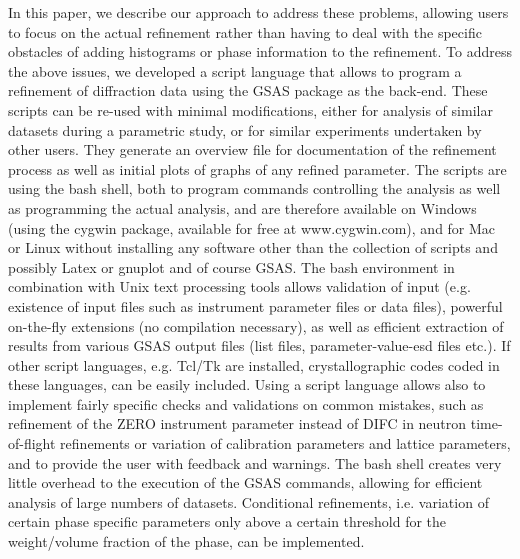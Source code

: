 In this paper, we describe our approach to address these problems, allowing users to focus on the actual refinement rather than having to deal with the specific obstacles of adding histograms or phase information to the refinement.  To address the above issues, we developed a script language that allows to program a refinement of diffraction data using the GSAS \cite{larson2004gsas} package as the back-end. These scripts can be re-used with minimal modifications, either for analysis of similar datasets during a parametric study, or for similar experiments undertaken by other users. They generate an overview file for documentation of the refinement process as well as initial plots of graphs of any refined parameter. The scripts are using the bash shell, both to program commands controlling the analysis as well as programming the actual analysis, and are therefore available on Windows (using the cygwin package, available for free at www.cygwin.com), and for Mac or Linux without installing any software other than the collection of scripts and possibly Latex or gnuplot and of course GSAS. The bash environment in combination with Unix text processing tools allows validation of input (e.g. existence of input files such as instrument parameter files or data files), powerful on-the-fly extensions (no compilation necessary), as well as efficient extraction of results from various GSAS output files (list files, parameter-value-esd files etc.). If other script languages, e.g. Tcl/Tk are installed, crystallographic codes coded in these languages, can be easily included. Using a script language allows also to implement fairly specific checks and validations on common mistakes, such as refinement of the ZERO instrument parameter instead of DIFC in neutron time-of-flight refinements or variation of calibration parameters and lattice parameters, and to provide the user with feedback and warnings. The bash shell creates very little overhead to the execution of the GSAS commands, allowing for efficient analysis of large numbers of datasets. Conditional refinements, i.e. variation of certain phase specific parameters only above a certain threshold for the weight/volume fraction of the phase, can be implemented. 
